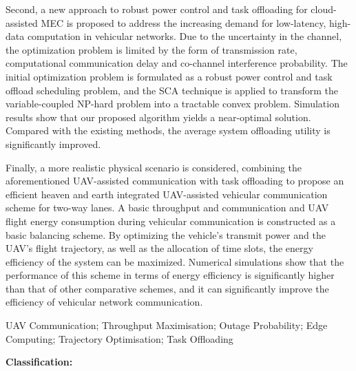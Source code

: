 Second, a new approach to robust power control and task offloading for cloud-assisted MEC is proposed to address the increasing demand for low-latency,
high-data computation in vehicular networks. Due to the uncertainty in the channel, the optimization problem is limited by the form of transmission rate,
computational communication delay and co-channel interference probability. The initial optimization problem is formulated as a robust power control and
task offload scheduling problem, and the SCA technique is applied to transform the variable-coupled NP-hard problem into a tractable convex problem.
Simulation results show that our proposed algorithm yields a near-optimal solution. Compared with the existing methods, the average system offloading
utility is significantly improved.

Finally, a more realistic physical scenario is considered, combining the aforementioned UAV-assisted communication with task offloading to propose an
efficient heaven and earth integrated UAV-assisted vehicular communication scheme for two-way lanes. A basic throughput and communication and UAV flight
energy consumption during vehicular communication is constructed as a basic balancing scheme. By optimizing the vehicle's transmit power and the UAV's flight
trajectory, as well as the allocation of time slots, the energy efficiency of the system can be maximized. Numerical simulations show that the performance of
this scheme in terms of energy efficiency is significantly higher than that of other comparative schemes, and it can significantly improve the efficiency of
vehicular network communication.

\begin{englishkeywords}
UAV Communication; Throughput Maximisation; Outage Probability; Edge Computing; Trajectory Optimisation; Task Offloading
\end{englishkeywords}

\makeatletter
\noindent\textbf{Classification:} \CAST@value@UDC
\makeatother
\cleardoublepage%
\makeatletter
{}
\pagestyle{fancy}
  \fancyhf{}
\makeatother
